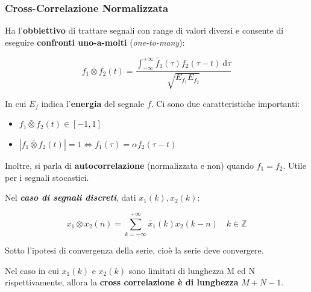 \documentclass[a4paper]{article}
\begin{document}
	\newpage
	
	\subsubsection{Cross-Correlazione Normalizzata}\label{cross correlazione normalizzata}
	
	Ha l'\textbf{obbiettivo} di trattare segnali con range di valori diversi e consente di eseguire \textbf{confronti uno-a-molti} (\emph{one-to-many}):
	
	\begin{equation*}
		f_{1} \bar{\otimes} f_{2}\left(t\right) = \dfrac{\displaystyle \int_{-\infty}^{+\infty} \tilde{f_{1}}\left(\tau\right) f_{2}\left(\tau - t\right) \: \mathrm{d}\tau}{\displaystyle \sqrt{E_{f_{1}} E_{f_{2}}}}
	\end{equation*}
	
	\noindent
	In cui $E_{f}$ indica l'\textbf{energia} del segnale $f$. Ci sono due caratteristiche importanti:
	
	\begin{itemize}
		\item $f_{1} \bar{\otimes} f_{2}\left(t\right) \in \left[-1, 1\right]$
		
		\item $\left|f_{1} \bar{\otimes} f_{2}\left(t\right)\right| = 1 \iff f_{1}\left(\tau\right) = \alpha f_{2} \left(\tau - t\right)$
	\end{itemize}
	
	\noindent
	Inoltre, si parla di \textbf{autocorrelazione} (normalizzata e non) quando $f_{1} = f_{2}$. Utile per i segnali stocastici.\newline
	
	\noindent
	Nel \textbf{\emph{caso di segnali discreti}}, dati $x_{1}\left(k\right), x_{2}\left(k\right)$:
	
	\begin{equation*}
		x_{1} \otimes x_{2}\left(n\right) = \sum_{k = -\infty}^{+\infty} \tilde{x_{1}}\left(k\right) x_{2} \left(k - n\right) \hspace{1em} k \in \mathbb{Z}
	\end{equation*}

	\noindent
	Sotto l'ipotesi di convergenza della serie, cioè la serie deve convergere.\newline
	
	\noindent
	Nel caso in cui $x_{1}\left(k\right)$ e $x_{2}\left(k\right)$ sono limitati di lunghezza M ed N rispettivamente, allora la \textbf{cross correlazione è di lunghezza} $M+N-1$.
	
\end{document}
